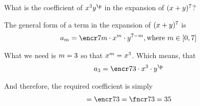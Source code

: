 



\SUBTRACT\vbone\vbtwo\p

\question[3] What is the coefficient of $x^{\vbtwo} y^{\p}$ in the expansion of $(x + y)^{7}$?


\watchout

\ifprintanswers
\fi 

\begin{solution}[\halfpage]
  The general form of a term in the expansion of $(x+y)^{7}$ is 
  \begin{align}
    a_m &= \encr\vbone{m}\cdot x^{m}\cdot y^{\vbone - m}, \text{where } m \in [0,\vbone]
  \end{align}

  What we need is $m=3$ so that $x^m = x^{3}$. Which means, that 
  \begin{align}
    a_{\vbtwo} &= \encr\vbone\vbtwo\cdot x^{\vbtwo}\cdot y^{\p}
  \end{align}

  And therefore, the required coefficient is simply
  \begin{align}
     = \encr\vbone\vbtwo  &= \fncr\vbone\vbtwo = \vbthree
  \end{align}
\end{solution}

